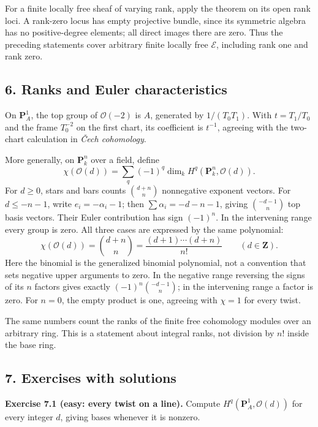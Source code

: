 \documentclass[11pt]{article}
\begin{document}
For a finite locally free sheaf of varying rank, apply the theorem on
its open rank loci. A rank-zero locus has empty projective bundle, since
its symmetric algebra has no positive-degree elements; all direct images
there are zero. Thus the preceding statements cover arbitrary finite
locally free \(\mathcal E\), including rank one and rank zero.

\subsection{6. Ranks and Euler
characteristics}\label{ranks-and-euler-characteristics}

On \(\mathbf P_A^1\), the top group of \(\mathcal O(-2)\) is \(A\),
generated by \(1/(T_0T_1)\). With \(t=T_1/T_0\) and the frame
\(T_0^{-2}\) on the first chart, its coefficient is \(t^{-1}\), agreeing
with the two-chart calculation in \emph{Čech cohomology}.

More generally, on \(\mathbf P_k^n\) over a field, define \[
\chi(\mathcal O(d))=\sum_q(-1)^q\dim_k H^q(\mathbf P_k^n,\mathcal O(d)).
\] For \(d\ge0\), stars and bars counts \(\binom{d+n}{n}\) nonnegative
exponent vectors. For \(d\le-n-1\), write \(e_i=-\alpha_i-1\); then
\(\sum\alpha_i=-d-n-1\), giving \(\binom{-d-1}{n}\) top basis vectors.
Their Euler contribution has sign \((-1)^n\). In the intervening range
every group is zero. All three cases are expressed by the same
polynomial: \[
\chi(\mathcal O(d))=\binom{d+n}{n}
=\frac{(d+1)\cdots(d+n)}{n!}\qquad(d\in\mathbf Z).
\] Here the binomial is the generalized binomial polynomial, not a
convention that sets negative upper arguments to zero. In the negative
range reversing the signs of its \(n\) factors gives exactly
\((-1)^n\binom{-d-1}{n}\); in the intervening range a factor is zero.
For \(n=0\), the empty product is one, agreeing with \(\chi=1\) for
every twist.

The same numbers count the ranks of the finite free cohomology modules
over an arbitrary ring. This is a statement about integral ranks, not
division by \(n!\) inside the base ring.

\subsection{7. Exercises with
solutions}\label{exercises-with-solutions-3}

\textbf{Exercise 7.1 (easy: every twist on a line).} Compute
\(H^q(\mathbf P_A^1,\mathcal O(d))\) for every integer \(d\), giving
bases whenever it is nonzero.
\end{document}
